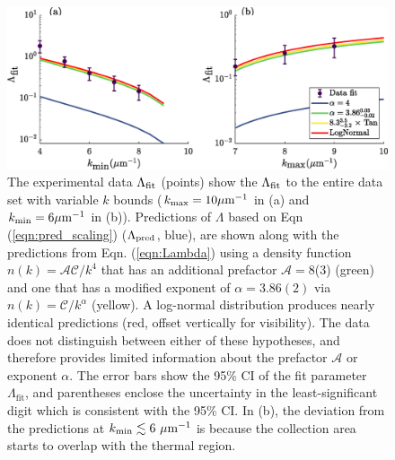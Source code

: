 	\begin{figure}
	\begin{center}
		\includegraphics[width=\columnwidth]{fig/QD/k_indep}
			\caption{The experimental data {$\Lambda_{\rm fit}$} (points) show the $\Lambda_{\rm fit}$ to the entire data set with variable $k$ bounds ($k_\textrm{max}=10\mu\textrm{m}^{-1}$ in (a) and $k_\textrm{min}=6\mu\textrm{m}^{-1}$ in (b)).
		Predictions of $\Lambda$ based on Eqn (\ref{eqn:pred_scaling}) ({$\Lambda_{\rm pred}$}, blue), are shown along with the predictions {from Eqn. (\ref{eqn:Lambda}) using} a density function $n(k){=\mathcal{AC}/k^4}$ that {has an additional prefactor $\mathcal{A}=$8(3)} %
		(green) and one that has %
		a modified exponent of {$\alpha=3.86(2)$ via $n(k)=\mathcal{C}/k^{\alpha}$} (yellow). 
		{A log-normal distribution produces nearly identical predictions (red, offset vertically for visibility).}
		The data does not distinguish between either of these hypotheses, and therefore provides limited information about {the prefactor $\mathcal{A}$ or exponent}%
		$\alpha$.
		The error bars show the 95\% CI of the fit parameter $\Lambda_\textrm{fit}$, and parentheses enclose the uncertainty in the least-significant digit which is consistent with the 95\% CI.
			In (b), the deviation from the predictions at $k_\textrm{min}\lesssim6~\mu\textrm{m}^{-1}$ is because the collection area starts to overlap with the thermal region.
			}
		\label{fig:k_indep}
	\end{center}
	\end{figure}


